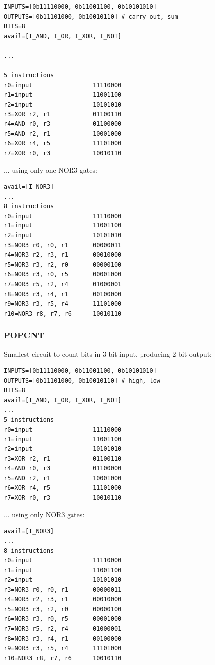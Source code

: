 \begin{lstlisting}
INPUTS=[0b11110000, 0b11001100, 0b10101010]
OUTPUTS=[0b11101000, 0b10010110] # carry-out, sum
BITS=8
avail=[I_AND, I_OR, I_XOR, I_NOT]

...

5 instructions
r0=input                 11110000
r1=input                 11001100
r2=input                 10101010
r3=XOR r2, r1            01100110
r4=AND r0, r3            01100000
r5=AND r2, r1            10001000
r6=XOR r4, r5            11101000
r7=XOR r0, r3            10010110
\end{lstlisting}

... using only one NOR3 gates:

\begin{lstlisting}
avail=[I_NOR3]
...
8 instructions
r0=input                 11110000
r1=input                 11001100
r2=input                 10101010
r3=NOR3 r0, r0, r1       00000011
r4=NOR3 r2, r3, r1       00010000
r5=NOR3 r3, r2, r0       00000100
r6=NOR3 r3, r0, r5       00001000
r7=NOR3 r5, r2, r4       01000001
r8=NOR3 r3, r4, r1       00100000
r9=NOR3 r3, r5, r4       11101000
r10=NOR3 r8, r7, r6      10010110
\end{lstlisting}

\subsubsection{POPCNT}

Smallest circuit to count bits in 3-bit input, producing 2-bit output:

\begin{lstlisting}
INPUTS=[0b11110000, 0b11001100, 0b10101010]
OUTPUTS=[0b11101000, 0b10010110] # high, low
BITS=8
avail=[I_AND, I_OR, I_XOR, I_NOT]
...
5 instructions
r0=input                 11110000
r1=input                 11001100
r2=input                 10101010
r3=XOR r2, r1            01100110
r4=AND r0, r3            01100000
r5=AND r2, r1            10001000
r6=XOR r4, r5            11101000
r7=XOR r0, r3            10010110
\end{lstlisting}

... using only NOR3 gates:

\begin{lstlisting}
avail=[I_NOR3]
...
8 instructions
r0=input                 11110000
r1=input                 11001100
r2=input                 10101010
r3=NOR3 r0, r0, r1       00000011
r4=NOR3 r2, r3, r1       00010000
r5=NOR3 r3, r2, r0       00000100
r6=NOR3 r3, r0, r5       00001000
r7=NOR3 r5, r2, r4       01000001
r8=NOR3 r3, r4, r1       00100000
r9=NOR3 r3, r5, r4       11101000
r10=NOR3 r8, r7, r6      10010110
\end{lstlisting}

